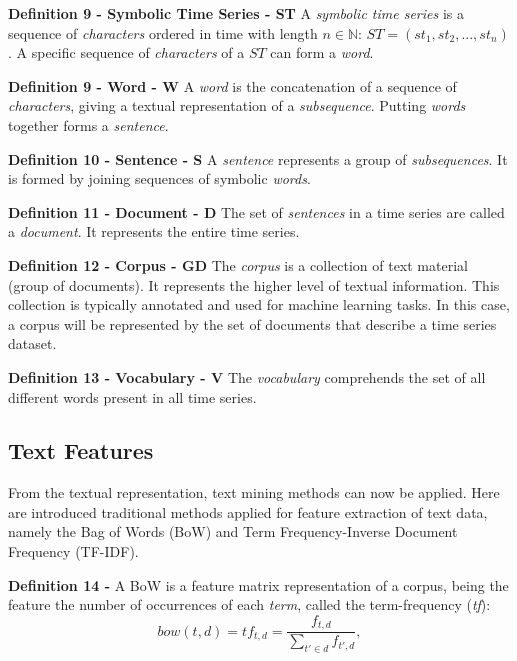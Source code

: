 \item \textbf{Definition 9 - Symbolic Time Series - ST} A \textit{symbolic time series} is a sequence of \textit{characters} ordered in time with length $n \in \mathbb{N}$: $ST = (st_1, st_2, ..., st_n)$. A specific sequence of \textit{characters} of a $ST$ can form a \textit{word}.

\item \textbf{Definition 9 - Word - W} A \textit{word} is the concatenation of a sequence of \textit{characters}, giving a textual representation of a \textit{subsequence}. Putting \textit{words} together forms a \textit{sentence}.


\item \textbf{Definition 10 - Sentence - S} A \textit{sentence} represents a group of \textit{subsequences}. It is formed by joining sequences of symbolic \textit{words}.

\item \textbf{Definition 11 - Document - D} The set of \textit{sentences} in a time series are called a \textit{document}. It represents the entire time series.

\item \textbf{Definition 12 - Corpus - GD} The \textit{corpus} is a collection of text material (group of documents). It represents the higher level of textual information. This collection is typically annotated and used for machine learning tasks. In this case, a corpus will be represented by the set of documents that describe a time series dataset.

\item \textbf{Definition 13 - Vocabulary - V} The \textit{vocabulary} comprehends the set of all different words present in all time series.

\subsection{Text Features}
\label{subsec:text_features}

From the textual representation, text mining methods can now be applied. Here are introduced traditional methods applied for feature extraction of text data, namely the Bag of Words (BoW) and  Term Frequency-Inverse Document Frequency (TF-IDF).
\par

\item \textbf{Definition 14 - } A BoW is a feature matrix representation of a corpus, being the feature the number of occurrences of each \textit{term}, called the term-frequency (\textit{tf}):
\begin{equation}
    bow(t,d) = tf_{t, d} = \frac{f_{t,d}}{\sum\limits_{t'\in d} f_{t',d}}, 
\end{equation}

